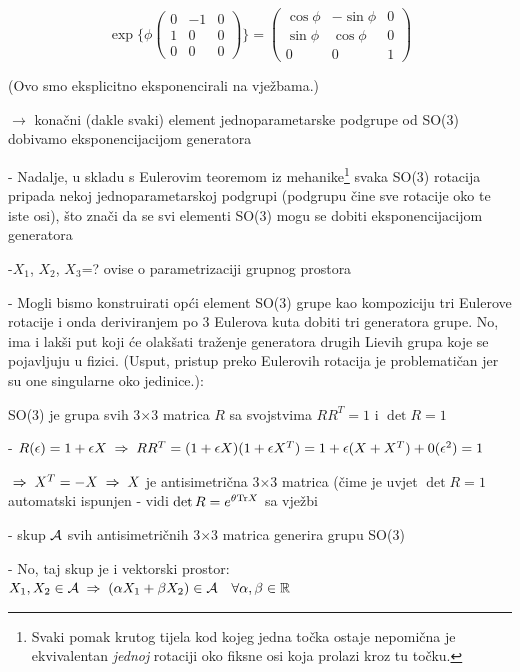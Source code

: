 \begin{displaymath}
\exp\Bigg\{ 
\phi  \left( \begin{array}{ccc}
0 & -1 & 0 \\
1 & 0 & 0 \\
0 & 0 & 0 
\end{array} \right)\Bigg\} =\left( 
\begin{array}{ccc}
\cos\phi & -\sin\phi & 0 \\
\sin\phi & \cos\phi & 0 \\
0 & 0 & 1 
\end{array}
\right)
\end{displaymath}

(Ovo smo eksplicitno eksponencirali na vježbama.)

$\to$ konačni (dakle svaki) element jednoparametarske podgrupe
od SO(3) dobivamo eksponencijacijom generatora 

- Nadalje, u skladu s Eulerovim teoremom iz mehanike\footnote{Svaki pomak krutog
tijela kod kojeg jedna točka ostaje nepomična je ekvivalentan \emph{jednoj}
rotaciji oko fiksne osi koja prolazi kroz tu točku.} svaka SO(3) rotacija 
pripada nekoj jednoparametarskoj podgrupi
 (podgrupu čine sve rotacije oko te iste osi), što znači da se
 svi elementi SO(3) mogu se dobiti eksponencijacijom generatora

-$X_1$, $X_2$, $X_3$=? \quad\textrm{ovise o parametrizaciji grupnog prostora}

- Mogli bismo konstruirati opći element SO(3) grupe kao kompoziciju tri
 Eulerove rotacije i onda deriviranjem po 3 Eulerova kuta dobiti tri
 generatora grupe. No, ima i lakši put koji će olakšati traženje 
 generatora drugih Lievih grupa koje se pojavljuju u fizici. 
 (Usput, pristup preko Eulerovih
 rotacija je problematičan jer su one singularne oko jedinice.):

SO(3) je grupa svih 3$\times$3 matrica $R$ sa svojstvima  
  $RR^{T}=1$ i $\det R=1$

- $R(\epsilon)=1+\epsilon X \;\Rightarrow\; RR^{T}=(1+\epsilon X)(1+\epsilon 
   X^{T}) = 1+\epsilon (X+X^{T})+0(\epsilon^2) = 1$

$\;\Rightarrow\; X^T=-X \;\Rightarrow\; X$ je antisimetrična 3$\times$3 matrica (čime je uvjet
$\det R=1$ automatski ispunjen - vidi 
   $\det R = e^{\theta\textrm{\scriptsize Tr} X}$ sa vježbi

- skup $\mathcal{A}$ svih antisimetričnih 3$\times$3 matrica generira grupu SO(3)

- No, taj skup je i vektorski prostor: $X_1,X_2\in\mathcal{A}\;\Rightarrow\;
    (\alpha X_1 + \beta X_2)\in\mathcal{A} \quad \forall \alpha, \beta\in\mathbb{R}$

